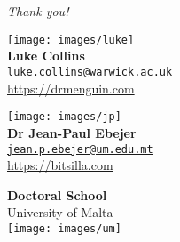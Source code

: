 \documentclass{beamer}
\begin{document}
    \section{}
    \begin{frame}
        
        \vfill\lato
        
        \centering
        \emph{\Huge Thank you!}
        
        \vfill
        \begin{center}
            \footnotesize
            \begin{minipage}{5cm}
                \centering 
                \texttt{[image: images/luke]}\\
                \textbf{Luke Collins}\\
                \href{mailto:luke.collins@warwick.ac.uk}{\texttt{luke.collins@warwick.ac.uk}}\\
                \href{https://drmenguin.com}{\ttfamily https://drmenguin.com}          
            \end{minipage}
            \hfil
            \begin{minipage}{5cm}
                \centering
                \texttt{[image: images/jp]}\\
                \textbf{Dr Jean-Paul Ebejer}\\
                \href{mailto:jean.p.ebejer@um.edu.mt}{\texttt{jean.p.ebejer@um.edu.mt}}\\
                \href{https://bitsilla.com}{\ttfamily https://bitsilla.com} 
            \end{minipage}
        \end{center}
        \vfil
        \scriptsize
        
        \color{gray!70!black}
        \textbf{Doctoral School}\\
        University of Malta\\[7pt]
        \texttt{[image: images/um]}

        
        
    \end{frame}
\end{document}
